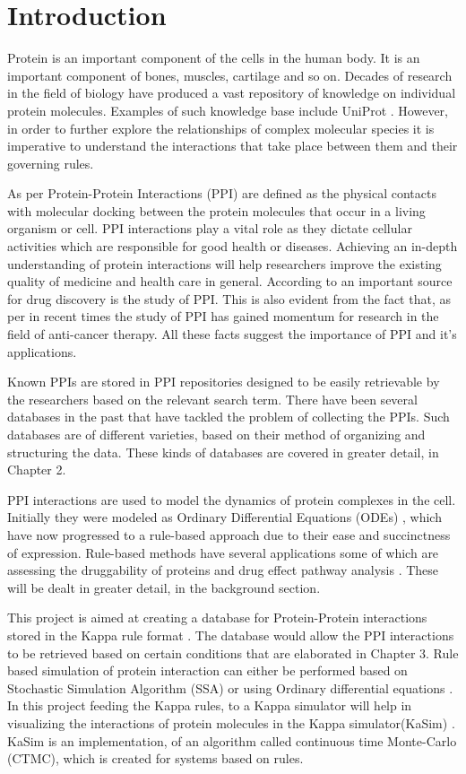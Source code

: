 \documentclass[msc,deptreport,ai]{infthesis}      %
\begin{document}
\chapter{Introduction}
Protein is an important component of the cells in the human body. It is an important component of bones, muscles, cartilage and so on. Decades of research in the field of biology have produced a vast repository of knowledge on individual protein molecules. Examples of such knowledge base include UniProt \cite{uniprot}. However, in order to further explore the relationships of complex molecular species it is imperative to understand the interactions that take place between them and their governing rules.

As per \cite{ppiDef} Protein-Protein Interactions (PPI) are defined as the physical contacts with molecular docking between the protein molecules that occur in a living organism or cell. PPI interactions play a vital role as they dictate cellular activities which are responsible for good health or diseases. Achieving an in-depth understanding of protein interactions will help researchers improve the existing quality of medicine and health care in general. According to \cite{ppimp} an important source for drug discovery is the study of PPI. This is also evident from the fact that, as per \cite{cancer} in recent times the study of PPI has gained momentum for research in the field of anti-cancer therapy. All these facts suggest the importance of PPI and it's applications. 

Known PPIs are stored in PPI repositories designed to be easily retrievable by the researchers based on the relevant search term. There have been several databases in the past that have tackled the problem of collecting the PPIs. Such databases are of different varieties, based on their method of organizing and structuring the data. These kinds of databases are covered in greater detail, in Chapter 2. 

PPI interactions are used to model the dynamics of protein complexes in the cell. Initially they were modeled as Ordinary Differential Equations (ODEs) \cite{ode}, which have now progressed to a rule-based approach due to their ease and succinctness of expression. Rule-based methods have several applications some of which are assessing the druggability of proteins \cite{proteinDruggability} and drug effect pathway analysis \cite{pathwayAnalysis}. These will be dealt in greater detail, in the background section. 

This project is aimed at creating a database for Protein-Protein interactions stored in the Kappa rule format \cite{kappa}. The database would allow the PPI interactions to be retrieved based on certain conditions that are elaborated in Chapter 3. Rule based simulation of protein interaction can either be performed based on Stochastic Simulation Algorithm (SSA) or using Ordinary differential equations \cite{chylek2014rule}. In this project feeding the Kappa rules, to a Kappa simulator will help in visualizing the interactions of protein molecules in the Kappa simulator(KaSim) \cite{kasim}. KaSim is an implementation, of an algorithm called continuous time Monte-Carlo (CTMC), which is created for systems based on rules. 
\end{document}
